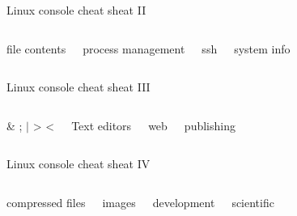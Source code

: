 \documentclass{beamer}
\begin{document}
\begin{frame}[fragile]{Linux console cheat sheat II}
  \fontsize{7pt}{7}\selectfont
  \begin{columns}
    \begin{block}{file contents}
      
    \end{block}
    \begin{block}{process management}
      
    \end{block}

    \begin{block}{ssh}
      
    \end{block}
    \begin{block}{system info}
      
    \end{block}
  \end{columns}
\end{frame}


\begin{frame}[fragile]{Linux console cheat sheat III}
  \fontsize{7pt}{7}\selectfont
  \begin{columns}
    \begin{block}{\& ; $|$ > <}
      
    \end{block}
    \begin{block}{Text editors}
      
    \end{block}

    \begin{block}{web}
      
    \end{block}
    \begin{block}{publishing}
      
    \end{block}
  \end{columns}
\end{frame}

\begin{frame}[fragile]{Linux console cheat sheat IV}
  \fontsize{7pt}{7}\selectfont
  \begin{columns}
    \begin{block}{compressed files}
      
    \end{block}
    \begin{block}{images}
      
    \end{block}

    \begin{block}{development}
      
    \end{block}
    \begin{block}{scientific}
      
    \end{block}
  \end{columns}
\end{frame}
\end{document}
